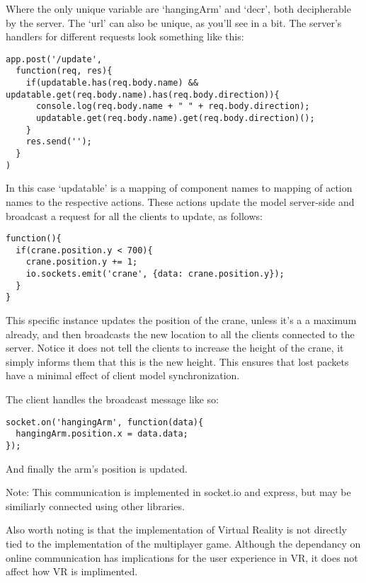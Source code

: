 \documentclass{article}
\begin{document}
\begin{enumerate}
		Where the only unique variable are `hangingArm' and `decr', both decipherable by the server.  The `url' can also be unique, as you'll see in a bit.
\clearpage
		The server's handlers for different requests look something like this:
 		
 		\begin{lstlisting}
app.post('/update', 
  function(req, res){
    if(updatable.has(req.body.name) && updatable.get(req.body.name).has(req.body.direction)){
      console.log(req.body.name + " " + req.body.direction);
      updatable.get(req.body.name).get(req.body.direction)();
    }
    res.send('');
  }
)
 		\end{lstlisting}

In this case `updatable' is a mapping of component names to mapping of action names to the respective actions.  These actions update the model server-side and broadcast a request for all the clients to update, as follows:
 		
 		\begin{lstlisting}
function(){
  if(crane.position.y < 700){
    crane.position.y += 1;
    io.sockets.emit('crane', {data: crane.position.y});
  }
}
 		\end{lstlisting}
 		This specific instance updates the position of the crane, unless it's a a maximum already, and then broadcasts the new location to all the clients connected to the server.  Notice it does not tell the clients to increase the height of the crane, it simply informs them that this is the new height.  This ensures that lost packets have a minimal effect of client model synchronization.
 		
 		The client handles the broadcast message like so:
 		
		\begin{lstlisting}
socket.on('hangingArm', function(data){
  hangingArm.position.x = data.data;
});
 		\end{lstlisting}
 		
 		And finally the arm's position is updated.

		Note:  This communication is implemented in socket.io and express, but may be similiarly connected using other libraries.
		
\end{enumerate} 

Also worth noting is that the implementation of Virtual Reality is not directly tied to the implementation of the multiplayer game.  Although the dependancy on online communication has implications for the user experience in VR, it does not affect how VR is implimented.
\end{document}
